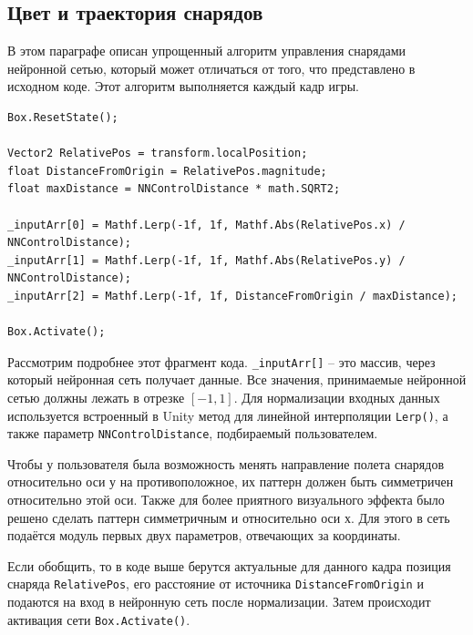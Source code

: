 \subsection{Цвет и траектория снарядов}

В этом параграфе описан упрощенный алгоритм управления снарядами нейронной сетью, который может отличаться от того, что представлено в исходном коде. Этот алгоритм выполняется каждый кадр игры.


\begin{lstlisting}[name=Projectile, caption={Projectile. Part 1}]
Box.ResetState(); 

Vector2 RelativePos = transform.localPosition;
float DistanceFromOrigin = RelativePos.magnitude;
float maxDistance = NNControlDistance * math.SQRT2;

_inputArr[0] = Mathf.Lerp(-1f, 1f, Mathf.Abs(RelativePos.x) / NNControlDistance);
_inputArr[1] = Mathf.Lerp(-1f, 1f, Mathf.Abs(RelativePos.y) / NNControlDistance);
_inputArr[2] = Mathf.Lerp(-1f, 1f, DistanceFromOrigin / maxDistance);
            
Box.Activate();

\end{lstlisting}

Рассмотрим подробнее этот фрагмент кода. \lstinline{_inputArr[]} -- это массив, через который нейронная сеть получает данные. Все значения, принимаемые нейронной сетью должны лежать в отрезке $[-1,1]$. Для нормализации входных данных используется встроенный в Unity метод для линейной интерполяции \lstinline{Lerp()}, а также параметр \lstinline{NNControlDistance}, подбираемый пользователем.

Чтобы у пользователя была возможность менять направление полета снарядов относительно оси у на противоположное, их паттерн должен быть симметричен относительно этой оси. Также для более приятного визуального эффекта было решено сделать паттерн симметричным и относительно оси х. Для этого в сеть подаётся модуль первых двух параметров, отвечающих за координаты.

Если обобщить, то в коде выше берутся актуальные для данного кадра позиция снаряда \lstinline{RelativePos}, его расстояние от источника \lstinline{DistanceFromOrigin} и подаются на вход в нейронную сеть после нормализации. Затем происходит активация сети \lstinline{Box.Activate()}.



